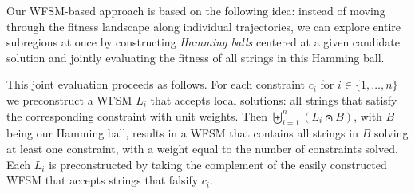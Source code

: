 \documentclass{llncs}
\begin{document}
Our WFSM-based approach is based on the following idea: instead of moving through 
the fitness landscape along individual trajectories, we can explore entire subregions at once
by constructing \emph{Hamming balls} centered at a given candidate solution and jointly evaluating the fitness of all strings in this Hamming ball.

This joint evaluation proceeds as follows.
For each constraint $c_i$ for $i \in \{1, \ldots, n\}$ we preconstruct
a WFSM $L_i$ that accepts local solutions:
all strings that satisfy the corresponding constraint with unit weights.
Then \mbox{$\biguplus_{i=1}^n (L_i \capdot B)$}, with $B$ being our Hamming ball,
results in a WFSM that contains all strings in $B$ solving at
least one constraint,
with a weight equal to the number of constraints solved.
Each $L_i$ is preconstructed by taking the complement of the easily
constructed WFSM that accepts strings that falsify $c_i$.
\end{document}
